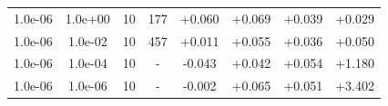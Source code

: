 \documentclass[11pt,a4paper]{article}
\begin{document}
\begin{table}[t]
{\begin{tabular}{*{8}c}
 1.0e-06 	 & 1.0e+00 	 & 10 & 177 	 & +0.060 & +0.069 & +0.039 & +0.029 \\ 
 1.0e-06 	 & 1.0e-02 	 & 10 & 457 	 & +0.011 & +0.055 & +0.036 & +0.050 \\ 
 1.0e-06 	 & 1.0e-04 	 & 10 & -	 & -0.043 & +0.042 & +0.054 & +1.180 \\ 
 1.0e-06 	 & 1.0e-06 	 & 10 & - & -0.002 & +0.065 & +0.051 & +3.402 \\ 
\end{tabular}}
\label{Tab::Noise0.3}
\end{table} 
\end{document}
